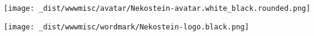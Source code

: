 \documentclass[11pt,landscape]{article}
\begin{document}
\texttt{[image: \_dist/wwwmisc/avatar/Nekostein-avatar.white\_black.rounded.png]}

\vfill
\flushright
\texttt{[image: \_dist/wwwmisc/wordmark/Nekostein-logo.black.png]}
\end{document}
